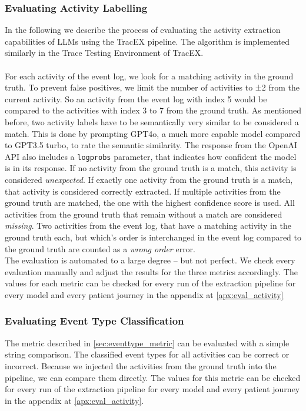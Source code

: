 \subsubsection{Evaluating Activity Labelling}\label{sec:eval_activity}
In the following we describe the process of evaluating the activity extraction capabilities of LLMs using the TracEX pipeline. The algorithm is implemented similarly in the Trace Testing Environment of TracEX.\\\\
For each activity of the event log, we look for a matching activity in the ground truth. To prevent false positives, we limit the number of activities to ±2 from the current activity. So an activity from the event log with index 5 would be compared to the activities with index 3 to 7 from the ground truth. As mentioned before, two activity labels have to be semantically very similar to be considered a match. This is done by prompting GPT4o, a much more capable model compared to GPT3.5 turbo, to rate the semantic similarity. The response from the OpenAI API also includes a \verb|logprobs| parameter, that indicates how confident the model is in its response. If no activity from the ground truth is a match, this activity is considered \emph{unexpected}. If exactly one activity from the ground truth is a match, that activity is considered correctly extracted. If multiple activities from the ground truth are matched, the one with the highest confidence score is used. All activities from the ground truth that remain without a match are considered \emph{missing}. Two activities from the event log, that have a matching activity in the ground truth each, but which's order is interchanged in the event log compared to the ground truth are counted as a \emph{wrong order} error.\\
The evaluation is automated to a large degree – but not perfect. We check every evaluation manually and adjust the results for the three metrics accordingly. The values for each metric can be checked for every run of the extraction pipeline for every model and every patient journey in the appendix at \ref{apx:eval_activity}

\subsubsection{Evaluating Event Type Classification}\label{sec:eval_event_type}
The metric described in \ref{sec:eventtype_metric} can be evaluated with a simple string comparison. The classified event types for all activities can be correct or incorrect. Because we injected the activities from the ground truth into the pipeline, we can compare them directly. The values for this metric can be checked for every run of the extraction pipeline for every model and every patient journey in the appendix at \ref{apx:eval_activity}.

